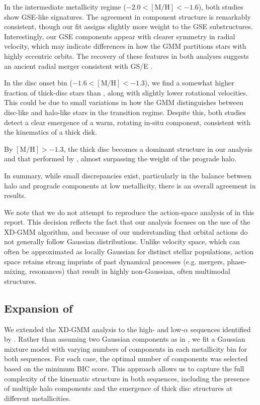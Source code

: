 \documentclass[a4paper,12pt]{article}
\begin{document}
In the intermediate metallicity regime ($-2.0 < \mathrm{[M/H]} < -1.6$), both studies show GSE-like 
signatures. The agreement in component structure is remarkably consistent, though our fit assigns slightly 
more weight to the GSE substructures. Interestingly, our GSE components appear with clearer symmetry in radial 
velocity, which may indicate differences in how the GMM partitions stars with highly eccentric orbits. 
The recovery of these features in both analyses suggests an ancient radial merger consistent with GS/E \citep{Belokurov2020}.

In the disc onset bin ($-1.6 < \mathrm{[M/H]} < -1.3$), we find a somewhat higher fraction of 
thick-disc stars than \citet{zhang2024existencemetalpoordiscmilky}, along with slightly lower rotational 
velocities. This could be due to small variations in how the GMM distinguishes between disc-like and 
halo-like stars in the transition regime. Despite this, both studies detect a clear emergence of a warm, 
rotating in-situ component, consistent with the kinematics of a thick disk.

By $[\mathrm{M/H}] > -1.3$, the thick disc becomes a dominant structure in our analysis and that performed
by \citet{zhang2024existencemetalpoordiscmilky}, almost surpassing the weight of the prograde halo.

In summary, while small discrepancies exist, particularly in the balance between halo and prograde components 
at low metallicity, there is an overall agreement in results.

We note that we do not attempt to reproduce the action-space analysis of \citet{zhang2024existencemetalpoordiscmilky} in this report. 
This decision reflects the fact that our analysis focuses on the use of the XD-GMM algorithm, and because of our
understanding that orbital actions do not generally follow Gaussian distributions. Unlike velocity space, which can often be 
approximated as locally Gaussian for distinct stellar populations, action space retains strong imprints 
of past dynamical processes (e.g. mergers, phase-mixing, resonances) that result in highly non-Gaussian, 
often multimodal structures.



\subsection{Expansion of \citet{Vis2024}}

We extended the XD-GMM analysis to the high- and low-$\alpha$ sequences identified by \citet{Vis2024}. 
Rather than assuming two Gaussian components as in \citet{Vis2024}, we fit a
Gaussian mixture model with varying numbers of components in each metallicity bin for both sequences. 
For each case, the optimal number of components was selected based on the minimum BIC score.
This approach allows us to capture the full complexity of the kinematic structure in both sequences,
including the presence of multiple halo components and the emergence of thick disc structures at different metallicities.
\end{document}
